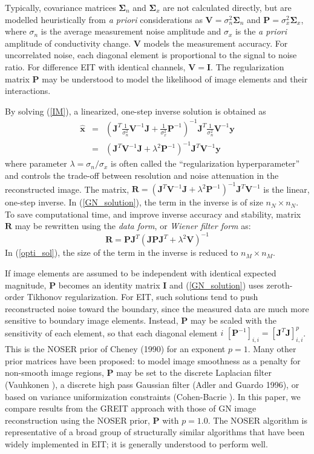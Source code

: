 \documentclass[12pt]{iopart}
\newcommand{\xH}{\mbox{$\mathbf{\hat x}$}}
\newcommand{\yB}{\mbox{$\mathbf{y}$}}
\newcommand{\RB}{\mbox{$\mathbf{R}$}}
\newcommand{\IB}{\mbox{$\mathbf{I}$}}
\newcommand{\JB}{\mbox{$\mathbf{J}$}}
\renewcommand{\PB}{\mbox{$\mathbf{P}$}}
\newcommand{\VB}{\mbox{$\mathbf{V}$}}
\newcommand{\SG}{\mbox{${\boldsymbol \Sigma}$}}
\begin{document}
Typically,  covariance matrices
$\SG_n$ and $\SG_x$ are not calculated directly, but
are modelled heuristically from {\em a priori}
considerations as 
 $\VB = \sigma_n^{2}\SG_n$
 and
 $\PB = \sigma_x^{2}\SG_x$,
where $\sigma_n$ is the average measurement noise amplitude and
$\sigma_x$ is the {\em a priori} amplitude of conductivity change.
$\VB$ models the measurement accuracy. For uncorrelated noise,
each diagonal element is proportional to the signal to noise
ratio. For difference EIT with identical channels, $\VB=\IB$. The
regularization matrix $\PB$ may be understood to model the
likelihood of image elements and their interactions.

By solving (\ref{IM}), a linearized, one-step inverse solution is
obtained as
\begin{eqnarray}\label{GN_solution}
\xH&=&\left(
    \JB^T \frac{1}{\sigma_n^2} \VB^{-1} \JB 
     +
    \frac{1}{\sigma_x^2} \PB^{-1}
    \right)^{-1}
    \JB^T \frac{1}{\sigma_n^2}\VB^{-1}\yB
\nonumber \\
   &=&\left(
    \JB^T \VB^{-1} \JB + \lambda^2 \PB^{-1}
    \right)^{-1}
    \JB^T \VB^{-1} \yB
\end{eqnarray}
where parameter  $\lambda=\sigma_n/\sigma_x$ is
often called the ``regularization hyperparameter'' and
controls the trade-off
between resolution and noise attenuation in the reconstructed
image.
The matrix,
$\RB=\left(\JB^T\VB^{-1}\JB+\lambda^2\PB^{-1}\right)^{-1}\JB^T\VB^{-1}$
is the linear, one-step inverse.
In (\ref{GN_solution}), the term in the inverse is of size
$n_N\times n_N$. To save computational time, and improve inverse
accuracy and stability, matrix $\RB$ may be rewritten 
using the {\em data form}, or {\em Wiener filter form} as:
\begin{equation}\label{opti_sol}
 \RB =\PB\JB^T
    \left(
       \JB\PB\JB^T+\lambda^2\VB
   \right)^{-1}
\end{equation}
In (\ref{opti_sol}), the size of the term in the
inverse is reduced to $n_M\times n_M$.

If image elements are assumed to be independent with identical
expected magnitude, $\PB$ becomes an identity matrix $\IB$ and
(\ref{GN_solution}) uses zeroth-order Tikhonov regularization. For
EIT, such solutions tend to push reconstructed noise toward the
boundary, since the measured data are much more sensitive to
boundary image elements. Instead, $\PB$ may be scaled with the
sensitivity of each element, so that each diagonal element $i$ 
$[\PB^{-1}]_{i,i} = \left[ \JB^T \JB
\right]_{i,i}^p$. This is the NOSER prior of Cheney \etal (1990)
for an exponent $p=1$. Many other prior matrices have been
proposed: to model image smoothness as a penalty for non-smooth
image regions, $\PB$ may be set to the discrete Laplacian filter
(Vauhkonen ), a discrete high pass Gaussian filter (Adler
and Guardo 1996), or based on variance uniformization
constraints (Cohen-Bacrie ).
In this paper, we compare results from the GREIT approach
with those of GN image reconstruction using the NOSER prior,
$\PB$ with $p=1.0$.  The NOSER algorithm is 
representative of a broad group of structurally similar 
algorithms that have been widely implemented in EIT;
it is generally understood to perform well.
\end{document}
